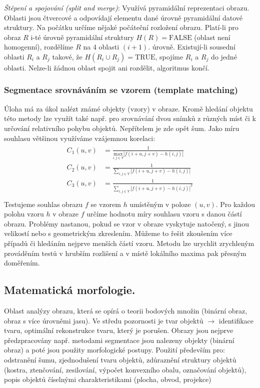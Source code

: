 \textit{Štěpení a spojování (split and merge)}: Využívá pyramidální reprezentaci obrazu. Oblasti jsou čtvercové a odpovídají elementu dané úrovně pyramidální datové struktury. Na počátku určíme nějaké počáteční rozložení obrazu. Platí-li pro obraz $ R $ i-té úrovně pyramidální struktury $ H(R) = \mathrm{FALSE} $ (oblast není homogenní), rozdělíme $ R $ na 4 oblasti $ (i+1) $. úrovně. Existují-li sousední oblasti $ R_i $ a $ R_j $ takové, že $ H(R_i \cup R_j) = \mathrm{TRUE} $, spojíme $ R_i $ a $ R_j $ do jedné oblasti. Nelze-li žádnou oblast spojit ani rozdělit, algoritmus končí.

\subsubsection*{Segmentace srovnáváním se vzorem (template matching)}
Úloha má za úkol nalézt známé objekty (vzory) v obraze. Kromě hledání objektu této metody lze využít také např. pro srovnávání dvou snímků z různých míst či k určování relativního pohybu objektů. Nepřítelem je zde opět šum. Jako míru souhlasu většinou využíváme vzájemnou korelaci:
\begin{align}
\begin{split}
C_1(u,v) &= \frac{1}{\underset{i,j \in V}{\mathrm{max}}|f(i+u,j+v)-h(i,j)|} \\
C_2(u,v) &= \frac{1}{\displaystyle{\sum_{i,j \in V}}|f(i+u,j+v)-h(i,j)|} \\
C_3(u,v) &= \frac{1}{\displaystyle{\sum_{i,j \in V}}|f(i+u,j+v)-h(i,j)|^2} \\
\end{split}
\end{align}
Testujeme souhlas obrazu $ f $ se vzorem $ h $ umístěným v poloze $ (u,v) $. Pro každou polohu vzoru $ h $ v obraze $ f $ určíme hodnotu míry souhlasu vzoru s danou částí obrazu. Problémy nastanou, pokud se vzor v obraze vyskytuje natočený, s jinou velikostí nebo s geometrickým zkreslením. Můžeme to řešit zkoušením více případů či hledáním nejprve menších částí vzoru. Metodu lze urychlit zrychleným prováděním testů v hrubším rozlišení a v místě lokálního maxima pak přesným doměřením.

\subsection{Matematická morfologie.}
Oblast analýzy obrazu, která se opírá o teorii bodových množin (binární obraz, obraz s více úrovněmi jasu). Ve středu pozornosti je tvar objektů $ \to $ identifikace tvaru, optimální rekonstrukce tvaru, který je porušen. Obrazy jsou nejprve předzpracovány např. metodami segmentace jsou nalezeny objekty (binární obraz) a poté jsou použity morfologické postupy. Použití především pro: odstranění šumu, zjednodušení tvaru objektů, zdůraznění struktury objektů (kostra, ztenčování, zesilování, výpočet konvexního obalu, označování objektů), popis objektů číselnými charakteristikami (plocha, obvod, projekce)

